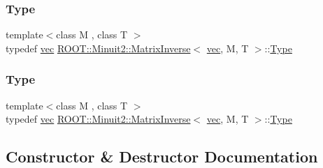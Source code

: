 \subsubsection{\texorpdfstring{Type}{Type}\hspace{0.1cm}{\footnotesize\ttfamily [1/2]}}
{\footnotesize\ttfamily template$<$class M , class T $>$ \\
typedef \mbox{\hyperlink{classROOT_1_1Minuit2_1_1vec}{vec}} \mbox{\hyperlink{classROOT_1_1Minuit2_1_1MatrixInverse}{R\+O\+O\+T\+::\+Minuit2\+::\+Matrix\+Inverse}}$<$ \mbox{\hyperlink{classROOT_1_1Minuit2_1_1vec}{vec}}, M, T $>$\+::\mbox{\hyperlink{classROOT_1_1Minuit2_1_1MatrixInverse_3_01vec_00_01M_00_01T_01_4_ae925e39424dcc097f76d033365b06efd}{Type}}}

\mbox{\label{classROOT_1_1Minuit2_1_1MatrixInverse_3_01vec_00_01M_00_01T_01_4_ae925e39424dcc097f76d033365b06efd}} 
\subsubsection{\texorpdfstring{Type}{Type}\hspace{0.1cm}{\footnotesize\ttfamily [2/2]}}
{\footnotesize\ttfamily template$<$class M , class T $>$ \\
typedef \mbox{\hyperlink{classROOT_1_1Minuit2_1_1vec}{vec}} \mbox{\hyperlink{classROOT_1_1Minuit2_1_1MatrixInverse}{R\+O\+O\+T\+::\+Minuit2\+::\+Matrix\+Inverse}}$<$ \mbox{\hyperlink{classROOT_1_1Minuit2_1_1vec}{vec}}, M, T $>$\+::\mbox{\hyperlink{classROOT_1_1Minuit2_1_1MatrixInverse_3_01vec_00_01M_00_01T_01_4_ae925e39424dcc097f76d033365b06efd}{Type}}}



\subsection{Constructor \& Destructor Documentation}
\mbox{\label{classROOT_1_1Minuit2_1_1MatrixInverse_3_01vec_00_01M_00_01T_01_4_ad267e62bc46dd1bab57b3194bd850be9}} 
